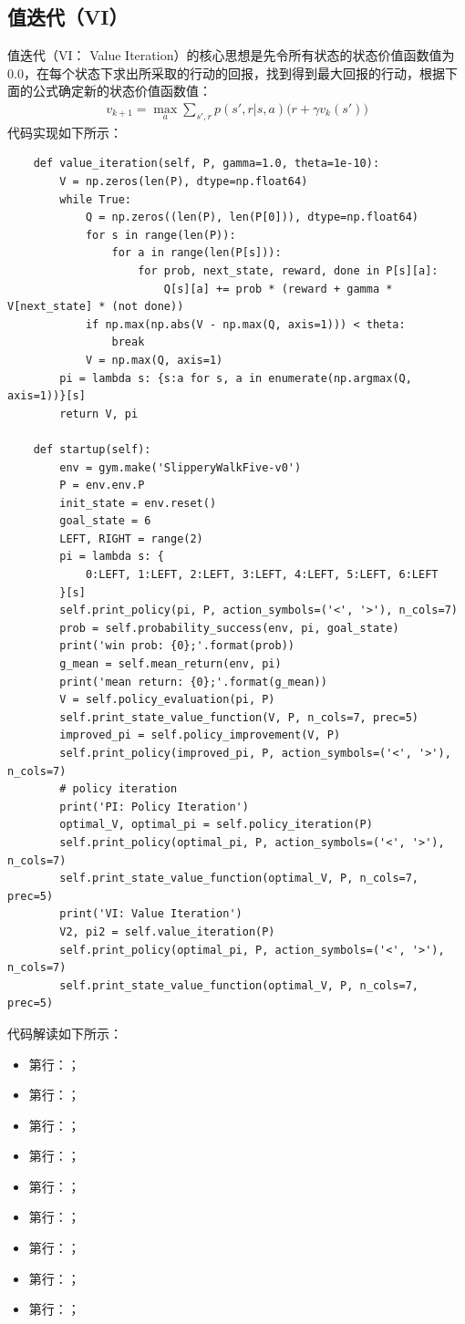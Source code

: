 \subsection{值迭代（VI）}
值迭代（VI： Value Iteration）的核心思想是先令所有状态的状态价值函数值为0.0，在每个状态下求出所采取的行动的回报，找到得到最大回报的行动，根据下面的公式确定新的状态价值函数值：
\begin{equation}
\begin{aligned}
    v_{k+1}=\max_{a} \sum_{s',r} p(s', r | s, a)\bigg( r + \gamma v_{k}(s') \bigg)
\end{aligned}
\label{chp001-value-iteration-formula}
\end{equation}
代码实现如下所示：
\begin{lstlisting}
    def value_iteration(self, P, gamma=1.0, theta=1e-10):
        V = np.zeros(len(P), dtype=np.float64)
        while True:
            Q = np.zeros((len(P), len(P[0])), dtype=np.float64)
            for s in range(len(P)):
                for a in range(len(P[s])):
                    for prob, next_state, reward, done in P[s][a]:
                        Q[s][a] += prob * (reward + gamma * V[next_state] * (not done))
            if np.max(np.abs(V - np.max(Q, axis=1))) < theta:
                break
            V = np.max(Q, axis=1)
        pi = lambda s: {s:a for s, a in enumerate(np.argmax(Q, axis=1))}[s]
        return V, pi

    def startup(self):
        env = gym.make('SlipperyWalkFive-v0')
        P = env.env.P
        init_state = env.reset()
        goal_state = 6
        LEFT, RIGHT = range(2)
        pi = lambda s: {
            0:LEFT, 1:LEFT, 2:LEFT, 3:LEFT, 4:LEFT, 5:LEFT, 6:LEFT
        }[s]
        self.print_policy(pi, P, action_symbols=('<', '>'), n_cols=7)
        prob = self.probability_success(env, pi, goal_state)
        print('win prob: {0};'.format(prob))
        g_mean = self.mean_return(env, pi)
        print('mean return: {0};'.format(g_mean))
        V = self.policy_evaluation(pi, P)
        self.print_state_value_function(V, P, n_cols=7, prec=5)
        improved_pi = self.policy_improvement(V, P)
        self.print_policy(improved_pi, P, action_symbols=('<', '>'), n_cols=7)
        # policy iteration
        print('PI: Policy Iteration')
        optimal_V, optimal_pi = self.policy_iteration(P)
        self.print_policy(optimal_pi, P, action_symbols=('<', '>'), n_cols=7)
        self.print_state_value_function(optimal_V, P, n_cols=7, prec=5)
        print('VI: Value Iteration')
        V2, pi2 = self.value_iteration(P)
        self.print_policy(optimal_pi, P, action_symbols=('<', '>'), n_cols=7)
        self.print_state_value_function(optimal_V, P, n_cols=7, prec=5)
\end{lstlisting}
代码解读如下所示：
\begin{itemize}
    \item 第行：；
    \item 第行：；
    \item 第行：；
    \item 第行：；
    \item 第行：；
    \item 第行：；
    \item 第行：；
    \item 第行：；
    \item 第行：；
\end{itemize}
